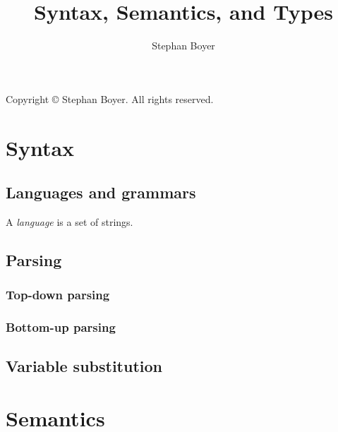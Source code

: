 \documentclass[ebook,oneside]{memoir} %
\title{Syntax, Semantics, and Types}
\author{Stephan Boyer}
\date{}
\begin{document}
  

  \frontmatter

    

    \pagebreak
    \hspace{0pt}
    \vfill
      \begin{center}
        Copyright \copyright{} \the\year{} Stephan Boyer. All rights reserved.
      \end{center}
    \vfill
    \hspace{0pt}
    \pagebreak

    

    \cleardoublepage
    \tableofcontents

  \mainmatter


    \part{Syntax}

      \chapter{Languages and grammars}

        A \emph{language} is a set of strings.

      \chapter{Parsing}

        \section{Top-down parsing}

        \section{Bottom-up parsing}

      \chapter{Variable substitution}

    \part{Semantics}
\end{document}
